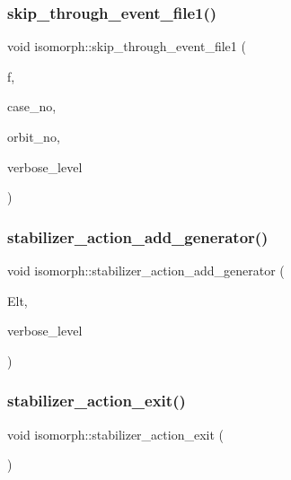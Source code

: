 \subsubsection{\texorpdfstring{skip\+\_\+through\+\_\+event\+\_\+file1()}{skip\_through\_event\_file1()}}
{\footnotesize\ttfamily void isomorph\+::skip\+\_\+through\+\_\+event\+\_\+file1 (\begin{DoxyParamCaption}\item[{ifstream \&}]{f,  }\item[{\mbox{\hyperlink{galois_8h_a09fddde158a3a20bd2dcadb609de11dc}{I\+NT}}}]{case\+\_\+no,  }\item[{\mbox{\hyperlink{galois_8h_a09fddde158a3a20bd2dcadb609de11dc}{I\+NT}}}]{orbit\+\_\+no,  }\item[{\mbox{\hyperlink{galois_8h_a09fddde158a3a20bd2dcadb609de11dc}{I\+NT}}}]{verbose\+\_\+level }\end{DoxyParamCaption})}

\mbox{\label{classisomorph_ae91af86c9c82cf9c5c7ee24a60e59460}} 
\subsubsection{\texorpdfstring{stabilizer\+\_\+action\+\_\+add\+\_\+generator()}{stabilizer\_action\_add\_generator()}}
{\footnotesize\ttfamily void isomorph\+::stabilizer\+\_\+action\+\_\+add\+\_\+generator (\begin{DoxyParamCaption}\item[{\mbox{\hyperlink{galois_8h_a09fddde158a3a20bd2dcadb609de11dc}{I\+NT}} $\ast$}]{Elt,  }\item[{\mbox{\hyperlink{galois_8h_a09fddde158a3a20bd2dcadb609de11dc}{I\+NT}}}]{verbose\+\_\+level }\end{DoxyParamCaption})}

\mbox{\label{classisomorph_afaa2e0e84d13a3116bb46c387b1fca61}} 
\subsubsection{\texorpdfstring{stabilizer\+\_\+action\+\_\+exit()}{stabilizer\_action\_exit()}}
{\footnotesize\ttfamily void isomorph\+::stabilizer\+\_\+action\+\_\+exit (\begin{DoxyParamCaption}{ }\end{DoxyParamCaption})}


